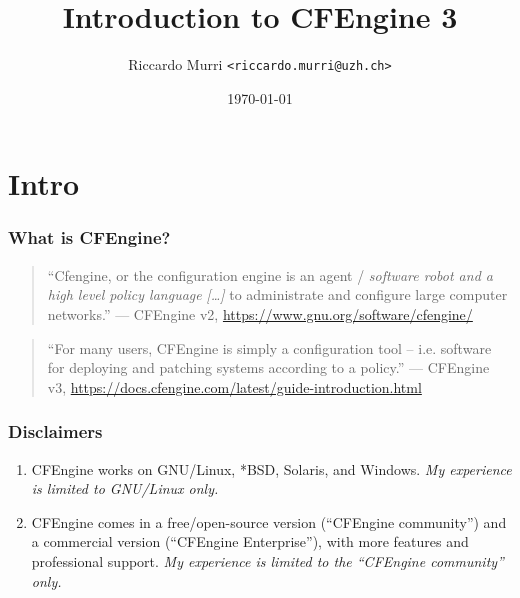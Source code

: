 \documentclass[english,serif,mathserif,usenames,dvipsnames]{beamer}
\begin{document}
\title[CFEngine 3]{Introduction to CFEngine 3}
\author{Riccardo Murri \texttt{<riccardo.murri@uzh.ch>}}
\date{\today}

\maketitle

\section{Intro}


\begin{frame}
  \frametitle{What is CFEngine?}
  \begin{quote}
    ``Cfengine, or the configuration engine is an agent /
    \emph{software robot and a high level policy language}
    \emph{[\ldots]} to administrate and configure large computer
    networks.''  --- CFEngine v2,
    \url{https://www.gnu.org/software/cfengine/}
  \end{quote}

  \begin{quote}
    ``For many users, CFEngine is simply a configuration tool –
    i.e. software for deploying and patching systems according to a
    policy.''
    --- CFEngine v3, \url{https://docs.cfengine.com/latest/guide-introduction.html}
  \end{quote}
\end{frame}


\begin{frame}
  \frametitle{Disclaimers}
  \begin{enumerate}
  \item CFEngine works on GNU/Linux, *BSD, Solaris, and Windows.
    \emph{My experience is limited to GNU/Linux only.}
  \item CFEngine comes in a free/open-source version (``CFEngine
    community'') and a commercial version (``CFEngine Enterprise''),
    with more features and professional support.  \emph{My experience
      is limited to the ``CFEngine community'' only.}
  \end{enumerate}
\end{frame}
\end{document}
